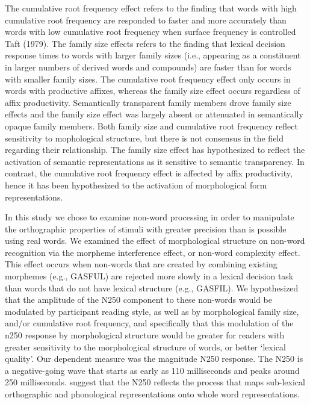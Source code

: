 \documentclass[preprint,12pt, authoryear, review]{elsarticle}
\begin{document}
The cumulative root frequency effect refers to the finding that words with high cumulative root frequency are responded to faster and more accurately than words with low cumulative root frequency when surface frequency is controlled \citep{taftRecognitionAffixedWords1979}  Taft (1979).  The family size effects refers to the finding that  lexical decision response times to words with larger family sizes (i.e., appearing as a constituent in larger numbers of derived words and compounds) are faster than for words with smaller family sizes. The cumulative root frequency effect only occurs in words with productive affixes, whereas the family size effect occurs regardless of affix productivity. Semantically transparent family members drove family size effects and the family size effect was largely absent or attenuated in semantically opaque family members. Both family size and  cumulative root frequency reflect sensitivity to mophological structure, but  there is not consensus in the field regarding their relationship.  The family size effect has hypothesized to reflect the activation of semantic representations as it sensitive to semantic transparency.  In contrast, the cumulative root frequency effect is affected by affix productivity, hence it has been hypothesized to the activation of morphological form representations.

In this study we chose to examine  non-word processing in order to manipulate the orthographic properties of stimuli with greater precision than is possible using real words.  We examined the effect of morphological structure on non-word recognition via the morpheme interference effect, or non-word complexity effect.  This effect occurs when non-words that are created by combining existing morphemes (e.g., GASFUL) are rejected more slowly in a lexical decision task than words that do not have lexical structure (e.g., GASFIL).  We hypothesized that the amplitude of the N250 component to  these non-words would be modulated by participant reading style, as well as by morphological family size, and/or cumulative root frequency, and specifically that  this modulation of the n250 response by morphological structure would be greater for readers with greater sensitivity to the morphological structure of words, or better `lexical quality'.  Our dependent measure was the magnitude N250 response.  The N250 is a negative-going wave that starts as early as 110 milliseconds and peaks around 250 milliseconds. {\renewcommand\&{and}\citet{holcombTimeCourseVisual2006}}  suggest that the N250 reflects the process that maps sub-lexical orthographic and phonological representations onto whole word representations.  
\end{document}
